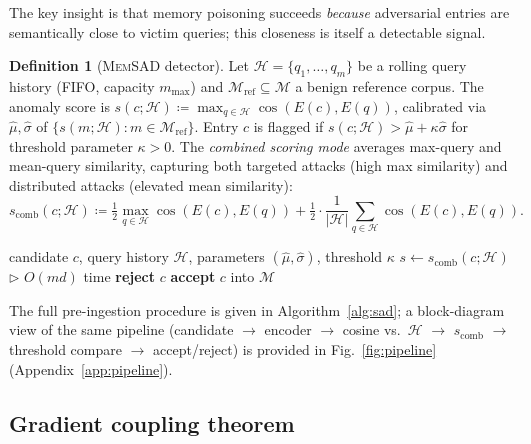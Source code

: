 \documentclass{article}
\theoremstyle{definition}
\newtheorem{definition}[theorem]{Definition}
\newcommand{\cM}{\mathcal{M}}
\newcommand{\cH}{\mathcal{H}}
\newcommand{\memsad}{\textnormal{\textsc{MemSAD}}}
\newcommand{\enc}{E}
\DeclareMathOperator{\cosim}{cos}
\begin{document}
The key insight is that memory poisoning succeeds \emph{because} adversarial entries are semantically close to victim queries; this closeness is itself a detectable signal.

\begin{definition}[\memsad{} detector]
\label{def:sad}
Let $\cH = \{q_1, \ldots, q_m\}$ be a rolling query history (FIFO, capacity $m_{\max}$) and $\cM_{\text{ref}} \subseteq \cM$ a benign reference corpus. The anomaly score is $s(c; \cH) \coloneqq \max_{q \in \cH} \cosim(\enc(c), \enc(q))$, calibrated via $\hat{\mu}, \hat{\sigma}$ of $\{s(m; \cH) : m \in \cM_{\text{ref}}\}$. Entry $c$ is flagged if $s(c; \cH) > \hat{\mu} + \kappa \hat{\sigma}$ for threshold parameter $\kappa > 0$.
The \emph{combined scoring mode} averages max-query and mean-query similarity, capturing both targeted attacks (high max similarity) and distributed attacks (elevated mean similarity):
\begin{equation}
  s_{\text{comb}}(c; \cH)
  \coloneqq \tfrac{1}{2} \max_{q \in \cH} \cosim(\enc(c), \enc(q))
  + \tfrac{1}{2} \cdot \frac{1}{|\cH|}\sum_{q \in \cH} \cosim(\enc(c), \enc(q)).
  \label{eq:sad_combined}
\end{equation}
\end{definition}

\begin{algorithm}[t]
\caption{\memsad{} pre-ingestion filtering}
\label{alg:sad}
\begin{algorithmic}[1]
\REQUIRE candidate $c$, query history $\cH$, parameters $(\hat{\mu}, \hat{\sigma})$, threshold $\kappa$
\STATE $s \leftarrow s_{\text{comb}}(c; \cH)$ \hfill $\triangleright$ $O(md)$ time
  \STATE \textbf{reject} $c$
\ELSE
  \STATE \textbf{accept} $c$ into $\cM$
\ENDIF
\end{algorithmic}
\end{algorithm}

\noindent The full pre-ingestion procedure is given in Algorithm~\ref{alg:sad}; a block-diagram view of the same pipeline (candidate $\to$ encoder $\to$ cosine vs.\ $\cH$ $\to$ $s_{\text{comb}}$ $\to$ threshold compare $\to$ accept/reject) is provided in Fig.~\ref{fig:pipeline} (Appendix~\ref{app:pipeline}).

\subsection{Gradient coupling theorem}
\label{sec:gradient}
\end{document}
